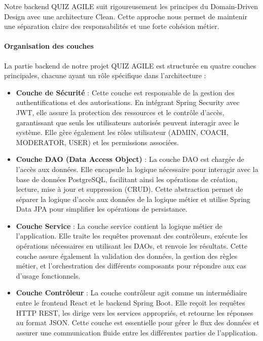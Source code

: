 \documentclass[12pt,a4paper]{report}
\begin{document}
Notre backend QUIZ AGILE suit rigoureusement les principes du Domain-Driven Design avec une architecture Clean. Cette approche nous permet de maintenir une séparation claire des responsabilités et une forte cohésion métier.

\paragraph{Organisation des couches}

La partie backend de notre projet QUIZ AGILE est structurée en quatre couches principales, chacune ayant un rôle spécifique dans l'architecture :

\begin{itemize}
\item \textbf{Couche de Sécurité} : Cette couche est responsable de la gestion des authentifications et des autorisations. En intégrant Spring Security avec JWT, elle assure la protection des ressources et le contrôle d'accès, garantissant que seuls les utilisateurs autorisés peuvent interagir avec le système. Elle gère également les rôles utilisateur (ADMIN, COACH, MODERATOR, USER) et les permissions associées.

\item \textbf{Couche DAO (Data Access Object)} : La couche DAO est chargée de l'accès aux données. Elle encapsule la logique nécessaire pour interagir avec la base de données PostgreSQL, facilitant ainsi les opérations de création, lecture, mise à jour et suppression (CRUD). Cette abstraction permet de séparer la logique d'accès aux données de la logique métier et utilise Spring Data JPA pour simplifier les opérations de persistance.

\item \textbf{Couche Service} : La couche service contient la logique métier de l'application. Elle traite les requêtes provenant des contrôleurs, exécute les opérations nécessaires en utilisant les DAOs, et renvoie les résultats. Cette couche assure également la validation des données, la gestion des règles métier, et l'orchestration des différents composants pour répondre aux cas d'usage fonctionnels.

\item \textbf{Couche Contrôleur} : La couche contrôleur agit comme un intermédiaire entre le frontend React et le backend Spring Boot. Elle reçoit les requêtes HTTP REST, les dirige vers les services appropriés, et retourne les réponses au format JSON. Cette couche est essentielle pour gérer le flux des données et assurer une communication fluide entre les différentes parties de l'application.
\end{itemize}
\end{document}

